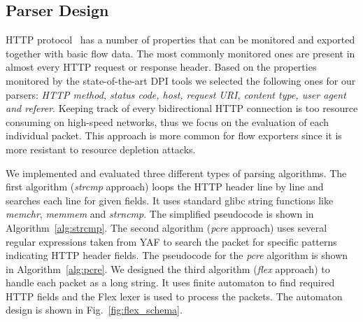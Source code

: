 \subsection{Parser Design} \label{subsec:http-tool_design}

HTTP protocol~\cite{rfc7230} has a number of properties that can be monitored and exported together with basic flow data. The most commonly monitored ones are present in almost every HTTP request or response header. Based on the properties monitored by the state-of-the-art DPI tools we selected the following ones for our parsers: \emph{HTTP method, status code, host, request URI, content type, user agent and referer}. Keeping track of every bidirectional HTTP connection is too resource consuming on high-speed networks, thus we focus on the evaluation of each individual packet. This approach is more common for flow exporters since it is more resistant to resource depletion attacks.

We implemented and evaluated three different types of parsing algorithms. The first algorithm (\emph{strcmp} approach) loops the HTTP header line by line and searches each line for given fields. It uses standard glibc string functions like \emph{memchr}, \emph{memmem} and \emph{strncmp}. The simplified pseudocode is shown in Algorithm~\ref{alg:strcmp}. The second algorithm (\emph{pcre} approach) uses several regular expressions taken from YAF to search the packet for specific patterns indicating HTTP header fields. The pseudocode for the \emph{pcre} algorithm is shown in Algorithm~\ref{alg:pcre}. We designed the third algorithm (\emph{flex} approach) to handle each packet as a long string. It uses finite automaton to find required HTTP fields and the Flex lexer is used to process the packets. The automaton design is shown in Fig.~\ref{fig:flex_schema}.

